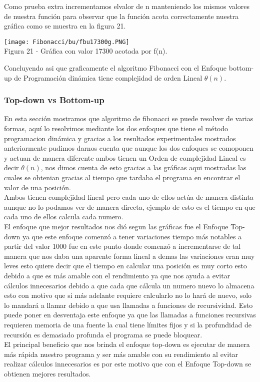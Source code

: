 \documentclass[12pt,twoside]{article}
\begin{document}
\newline
Como prueba extra incrementamos elvalor de n manteniendo los mismos valores de nuestra función para observar que la función acota correctamente nuestra gráfica como se muestra en la figura 21.
\begin{center}
    \texttt{[image: Fibonacci/bu/fbu17300g.PNG]}\\
    Figura 21 - Gráfica con valor 17300 acotada por f(n).
\end{center}
Concluyendo asi que graficamente el algoritmo Fibonacci con el Enfoque \newline bottom-up de Programación dinámica  tiene complejidad de orden Lineal $\theta{(n)}$.

\subsubsection{Top-down vs Bottom-up}
En esta sección mostramos que algoritmo de fibonacci se puede resolver de varias formas, aquí lo resolvimos mediante los dos enfoques que tiene el método programacion dinámica y gracias a los resultados experimentales mostrados anteriormente pudimos darnos cuenta que aunque los dos enfoques se comoponen y actuan de manera diferente ambos tienen un Orden de complejidad Lineal es decir $\theta{(n)}$, nos dimos cuenta de esto gracias a las gráficas aqui mostradas las cuales se obtenian gracias al tiempo que tardaba el programa en encontrar el valor de una posición.\\
Ambos tienen complejidad líneal pero cada uno de ellos actúa de manera distinta aunque no lo podamos ver de manera directa, ejemplo de esto es el tiempo en que cada uno de ellos calcula cada numero. \\
El enfoque que mejor resultados nos dió segun las gráficas fue el Enfoque Top-down ya que este enfoque comenzó a tener variaciones tiempo más notables a partir del valor 1000 fue en este punto donde comenzó a incrementarse de tal manera que nos daba una aparente forma lineal a demas las variaciones eran muy leves esto quiere decir que el tiempo en calcular una posición es muy corto esto debido a que es más amable con el rendimiento ya que nos ayuda a evitar cálculos innecesarios debido a que cada que cálcula un numero nuevo lo almacena esto con motivo que si más adelante requiere calcularlo no lo hará de nuevo, solo lo mandará a llamar debido a que usa llamadas a funciones de recursividad. Esto puede poner en desventaja este enfoque ya que  las llamadas a funciones recursivas requieren memoria de una fuente la cual tiene límites fijos y si la profundidad de recursión es demasiado profunda el programa se puede bloquear. \\
El principal beneficio que nos brinda el enfoque top-down es ejecutar de manera más rápida nuestro programa y ser más amable con su rendimiento al evitar realizar cálculos innecesarios es por este motivo que con el Enfoque Top-down se obtienen mejores resultados.
\newpage
\end{document}
